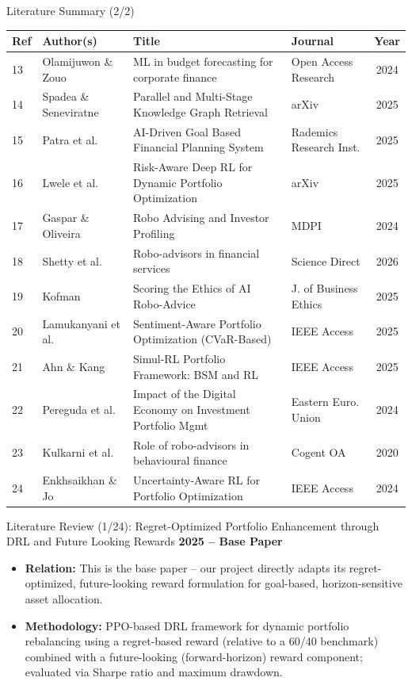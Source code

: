 \documentclass{beamer}
\begin{document}
\begin{frame}{Literature Summary (2/2)}
    \tiny
    \centering
    \begin{tabular}{p{0.5cm} p{2cm} p{4cm} p{2.5cm} c}
        \toprule
        \textbf{Ref} & \textbf{Author(s)} & \textbf{Title} & \textbf{Journal} & \textbf{Year} \\
        \midrule
        13 & Olamijuwon \& Zouo & ML in budget forecasting for corporate finance & Open Access Research & 2024 \\
        14 & Spadea \& Seneviratne & Parallel and Multi-Stage Knowledge Graph Retrieval & arXiv & 2025 \\
        15 & Patra et al. & AI-Driven Goal Based Financial Planning System & Rademics Research Inst. & 2025 \\
        16 & Lwele et al. & Risk-Aware Deep RL for Dynamic Portfolio Optimization & arXiv & 2025 \\
        17 & Gaspar \& Oliveira & Robo Advising and Investor Profiling & MDPI & 2024 \\
        18 & Shetty et al. & Robo-advisors in financial services & Science Direct & 2026 \\
        19 & Kofman & Scoring the Ethics of AI Robo-Advice & J. of Business Ethics & 2025 \\
        20 & Lamukanyani et al. & Sentiment-Aware Portfolio Optimization (CVaR-Based) & IEEE Access & 2025 \\
        21 & Ahn \& Kang & Simul-RL Portfolio Framework: BSM and RL & IEEE Access & 2025 \\
        22 & Pereguda et al. & Impact of the Digital Economy on Investment Portfolio Mgmt & Eastern Euro. Union & 2024 \\
        23 & Kulkarni et al. & Role of robo-advisors in behavioural finance & Cogent OA & 2020 \\
        24 & Enkhsaikhan \& Jo & Uncertainty-Aware RL for Portfolio Optimization & IEEE Access & 2024 \\
        \bottomrule
    \end{tabular}
\end{frame}

\begin{frame}{Literature Review (1/24): Regret-Optimized Portfolio Enhancement through DRL and Future Looking Rewards}
\small
\textbf{2025 -- Base Paper}
\begin{itemize}
    \item \textbf{Relation:} This is the base paper -- our project directly adapts its regret-optimized, future-looking reward formulation for goal-based, horizon-sensitive asset allocation.
    \item \textbf{Methodology:} PPO-based DRL framework for dynamic portfolio rebalancing using a regret-based reward (relative to a 60/40 benchmark) combined with a future-looking (forward-horizon) reward component; evaluated via Sharpe ratio and maximum drawdown.
\end{itemize}
\end{frame}
\end{document}
